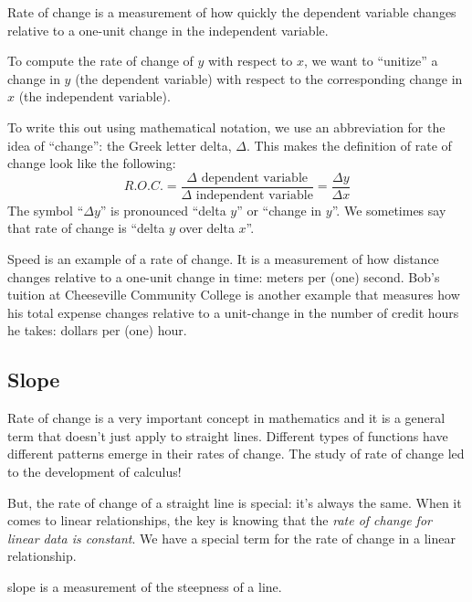 \begin{boxdef}
Rate of change is a measurement of how quickly the dependent variable changes relative to a one-unit change in the independent variable.
\end{boxdef}

To compute the rate of change of $y$ with respect to $x$, we want to ``unitize'' a change in $y$ (the dependent variable) with respect to the corresponding change in $x$ (the independent variable).

To write this out using mathematical notation, we use an abbreviation for the idea of ``change'': the Greek letter delta, $\Delta$. This makes the definition of rate of change look like the following:
\[R.O.C. = \frac{\Delta \text{ dependent variable}}{\Delta \text{ independent variable}} = \frac{\Delta y}{\Delta x}\]
The symbol ``$\Delta y$'' is pronounced ``delta $y$'' or ``change in $y$''. We sometimes say that rate of change is ``delta $y$ over delta $x$''.


Speed is an example of a rate of change. It is a measurement of how distance changes relative to a one-unit change in time: meters per (one) second. Bob's tuition at Cheeseville Community College is another example that measures how his total expense changes relative to a unit-change in the number of credit hours he takes: dollars per (one) hour.


\subsection{Slope}

Rate of change is a very important concept in mathematics and it is a general term that doesn't just apply to straight lines. Different types of functions have different patterns emerge in their rates of change. The study of rate of change led to the development of calculus!

But, the rate of change of a straight line is special: it's always the same. When it comes to linear relationships, the key is knowing that the \textit{rate of change for linear data is constant}. We have a special term for the rate of change in a linear relationship.

\begin{boxdef}[Slope]
\Gls{slope} is a measurement of the steepness of a line.
\end{boxdef}

